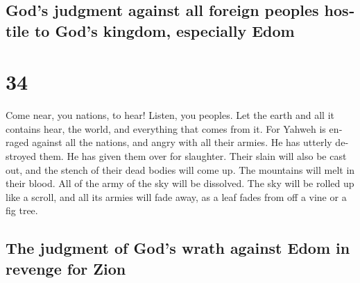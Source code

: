\begin{paracol}{2}
\switchcolumn
\begin{otherlanguage}{english}

\hypertarget{gods-judgment-against-all-foreign-peoples-hostile-to-gods-kingdom-especially-edom}{%
\subsection{God's judgment against all foreign peoples hostile to God's
kingdom, especially
Edom}\label{gods-judgment-against-all-foreign-peoples-hostile-to-gods-kingdom-especially-edom}}

\hypertarget{section-67}{%
\section{34}\label{section-67}}

 Come near, you nations, to hear! Listen, you peoples. Let
the earth and all it contains hear, the world, and everything that comes
from it.  For Yahweh is enraged against all the nations,
and angry with all their armies. He has utterly destroyed them. He has
given them over for slaughter.  Their slain will also be
cast out, and the stench of their dead bodies will come up. The
mountains will melt in their blood.  All of the army of
the sky will be dissolved. The sky will be rolled up like a scroll, and
all its armies will fade away, as a leaf fades from off a vine or a fig
tree.

\hypertarget{the-judgment-of-gods-wrath-against-edom-in-revenge-for-zion}{%
\subsection{The judgment of God's wrath against Edom in revenge for
Zion}\label{the-judgment-of-gods-wrath-against-edom-in-revenge-for-zion}}


\end{otherlanguage}
\end{paracol}
